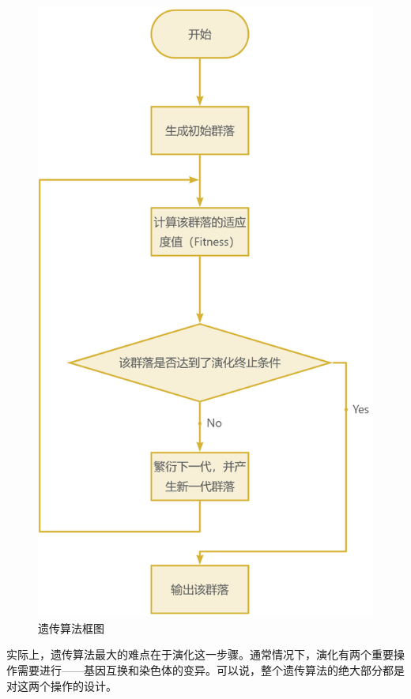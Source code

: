 \begin{figure}[h]
    \centering
    \includegraphics[scale=0.15]{res/GeneticAlgorithmDiagram.png}
    \caption{遗传算法框图}
    \label{GeneticAlgorithmDiagram}
\end{figure}

实际上，遗传算法最大的难点在于演化这一步骤。通常情况下，演化有两个重要操作需要进行——基因互换和染色体的变异。可以说，整个遗传算法的绝大部分都是对这两个操作的设计。


